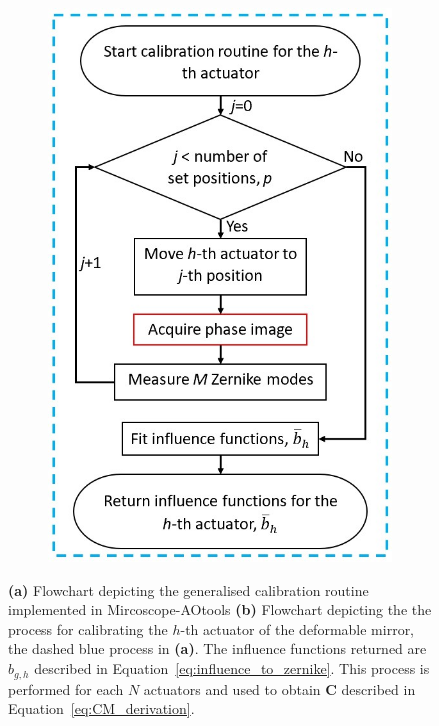 \begin{figure}[h]
\begin{subfigure}{0.45\textwidth}
		\includegraphics[width=1\linewidth, scale=0.5]{images/Ith_actuator_calibration_workflow_blue_border.jpg}
		\caption{}
		\label{fig:Ith_actuator_calibration_workflow_blue_border}
	\end{subfigure}
	\caption[Calibration routine workflow]{\textbf{(a)} Flowchart depicting the generalised calibration routine implemented in Mircoscope-AOtools \textbf{(b)} Flowchart depicting the the process for calibrating the $h$-th actuator of the deformable mirror, the dashed blue process in \textbf{(a)}. The influence functions returned are $b_{g,h}$ described in Equation~\ref{eq:influence_to_zernike}. This process is performed for each $N$ actuators and used to obtain $\boldsymbol{C}$ described in Equation~\ref{eq:CM_derivation}.}
	\label{fig:calibration_workflow}
\end{figure}


